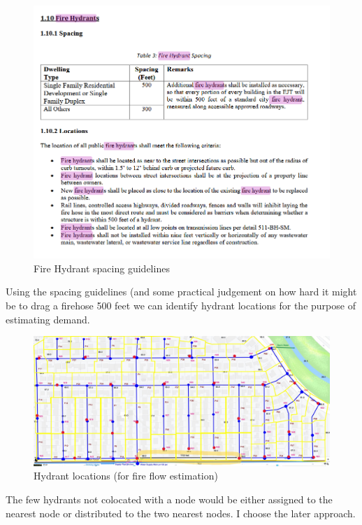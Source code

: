 \documentclass[12pt]{article}
\begin{document}
\begin{enumerate}
\begin{enumerate}[a)]
\begin{figure}[h!] %
   \centering
   \includegraphics[width=5.5in]{Hydrants-1.png} 
   \caption{Fire Hydrant spacing guidelines}
   \label{fig:hydrant1}
\end{figure}
\clearpage

Using the spacing guidelines (and some practical judgement on how hard it might be to drag a firehose 500 feet we can identify hydrant locations for the purpose of estimating demand.

\begin{figure}[h!] %
   \centering
   \includegraphics[width=6.5in]{SomewhereHydrants.jpg} 
   \caption{Hydrant locations (for fire flow estimation)}
   \label{fig:water_network_layout}
\end{figure}

The few hydrants not colocated with a node would be either assigned to the nearest node or distributed to the two nearest nodes.  I choose the later approach.
\clearpage


\end{enumerate}
\end{enumerate}
\end{document}
